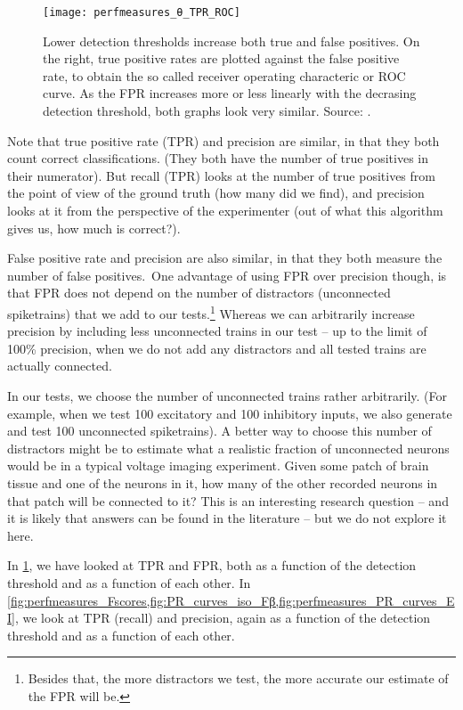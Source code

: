 \begin{figure}
    \texttt{[image: perfmeasures\_θ\_TPR\_ROC]}
    \caption
    {Lower detection thresholds increase both true and false positives. On the right, true positive rates are plotted against the false positive rate, to obtain the so called receiver operating characteric or ROC curve. As the FPR increases more or less linearly with the decrasing detection threshold, both graphs look very similar.
    Source: .}
    \label{fig:perfmeasures_θ_TPR_ROC}
\end{figure}

Note that true positive rate (TPR) and precision are similar, in that they both count correct classifications. (They both have the number of true positives in their numerator). But recall (TPR) looks at the number of true positives from the point of view of the ground truth (how many did we find), and precision looks at it from the perspective of the experimenter (out of what this algorithm gives us, how much is correct?).

False positive rate and precision are also similar, in that they both measure the number of false positives.\
One advantage of using FPR over precision though, is that FPR does not depend on the number of distractors (unconnected spiketrains) that we add to our tests.\footnote{Besides that, the more distractors we test, the more accurate our estimate of the FPR will be.}
Whereas we can arbitrarily increase precision by including less unconnected trains in our test -- up to the limit of 100\% precision, when we do not add any distractors and all tested trains are actually connected.

In our tests, we choose the number of unconnected trains rather arbitrarily. (For example, when we test 100 excitatory and 100 inhibitory inputs, we also generate and test 100 unconnected spiketrains). A better way to choose this number of distractors might be to estimate what a realistic fraction of unconnected neurons would be in a typical voltage imaging experiment. Given some patch of brain tissue and one of the neurons in it, how many of the other recorded neurons in that patch will be connected to it? This is an interesting research question -- and it is likely that answers can be found in the literature -- but we do not explore it here.

In \cref{fig:perfmeasures_θ_TPR_ROC}, we have looked at TPR and FPR, both as a function of the detection threshold and as a function of each other. In \cref{fig:perfmeasures_Fscores,fig:PR_curves_iso_Fβ,fig:perfmeasures_PR_curves_EI}, we look at TPR (recall) and precision, again as a function of the detection threshold and as a function of each other.

